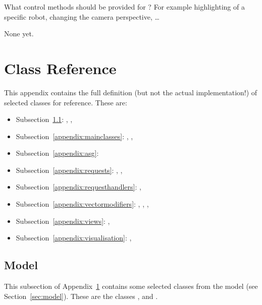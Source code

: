 \begin{appendix}
\begin{designQuestion}
What control methods should be provided for ? For example highlighting of a specific robot, changing the camera perspective, \ldots
\end{designQuestion}
\begin{resolution}
None yet.
\end{resolution}

\section{Class Reference}\label{sec:classlist}

This appendix contains the full definition (but not the actual implementation!) of selected classes for reference. These are:
\begin{itemize}
\item Subsection~\ref{appendix:implmodel}: , , 
\item Subsection~\ref{appendix:mainclasses}: , , 
\item Subsection~\ref{appendix:asg}: 
\item Subsection~\ref{appendix:requests}: , , 
\item Subsection~\ref{appendix:requesthandlers}: , 
\item Subsection~\ref{appendix:vectormodifiers}: , , , 
\item Subsection~\ref{appendix:views}: , 
\item Subsection~\ref{appendix:visualisation}: , 
\end{itemize}
%

\subsection{Model}\label{appendix:implmodel}
This subsection of Appendix~\ref{sec:classlist} contains some selected classes from the model (see Section~\ref{sec:model}). These are the classes ,  and .


\end{appendix}
